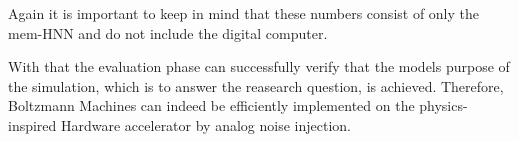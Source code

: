 Again it is important to keep in mind that these numbers consist of only the \ac{mem-HNN} and do not include the digital computer.                                                                  	                                                                                                                                                                                                                                                                                                                                                                                                                                                                                                                                                                                                                                                                                                                                                                                                                                                                                    

With that the evaluation phase can successfully verify that the models purpose of the simulation, which is to answer the reasearch question, is achieved.
Therefore, Boltzmann Machines can indeed be efficiently implemented on the physics-inspired Hardware accelerator by analog noise injection. 